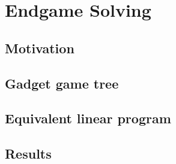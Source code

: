\chapter{Endgame Solving}

\section{Motivation}

\section{Gadget game tree}

\section{Equivalent linear program}

\section{Results}
